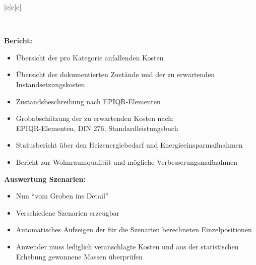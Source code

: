\documentclass[fleqn,twoside,dvipsnames]{article}
\begin{document}
\begin{itemize}
\begin{itemize}
{\begin{tabular}{|c|c|c|}
                         \\ \hline
                        \end{tabular}} \vspace*{1mm} \\
                \end{itemize}
                \textbf{Bericht:}
                \begin{itemize}
                    \item Übersicht der pro Kategorie anfallenden Kosten
                    \item Übersicht der dokumentierten Zustände und der zu erwartenden Instandsetzungskosten
                    \item Zustandsbeschreibung nach EPIQR-Elementen
                    \item Grobabschätzung der zu erwartenden Kosten nach: \\EPIQR-Elementen, DIN 276, Standardleistungsbuch
                    \item Statusbericht über den Heizenergiebedarf und Energieeinsparmaßnahmen
                    \item Bericht zur Wohnraumqualität und mögliche Verbesserungsmaßnahmen
                \end{itemize}
                \textbf{Auswertung Szenarien:}
                \begin{itemize}
                    \item Nun \enquote{vom Groben ins Detail}
                    \item Verschiedene Szenarien erzeugbar
                    \item Automatisches Aufzeigen der für die Szenarien berechneten Einzelpositionen
                    \item Anwender muss lediglich veranschlagte Kosten und aus der statistischen Erhebung gewonnene Massen überprüfen
            \end{itemize}
        \end{itemize}
\end{document}
